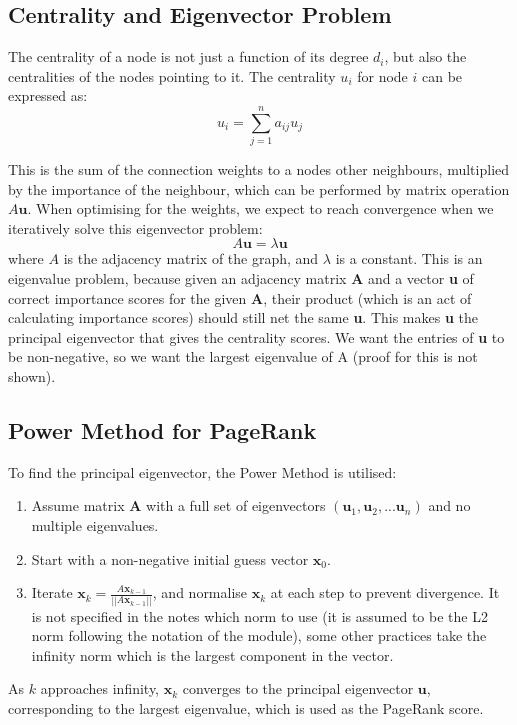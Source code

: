 \subsection*{Centrality and Eigenvector Problem}
The centrality of a node is not just a function of its degree \( d_i \), but also the centralities of the nodes pointing to it. The centrality \( u_i \) for node \( i \) can be expressed as:
\[ u_i = \sum_{j=1}^{n} a_{ij}u_j \]

This is the sum of the connection weights to a nodes other neighbours, multiplied by the importance of the neighbour, which can be performed by matrix operation $A\textbf{u}$. When optimising for the weights, we expect to reach convergence when we iteratively solve this eigenvector problem:
\[ A\mathbf{u} = \lambda \mathbf{u} \]
where \( A \) is the adjacency matrix of the graph, and \( \lambda \) is a constant. This is an eigenvalue problem, because given an adjacency matrix \textbf{A} and a vector \textbf{u} of correct importance scores for the given \textbf{A}, their product (which is an act of calculating importance scores) should still net the same \textbf{u}. This makes \textbf{u} the principal eigenvector that gives the centrality scores. We want the entries of \textbf{u} to be non-negative, so we want the largest eigenvalue of A (proof for this is not shown).

\subsection*{Power Method for PageRank}
To find the principal eigenvector, the Power Method is utilised:
\begin{enumerate}
     \item Assume matrix $\textbf{A}$ with a full set of eigenvectors $(\textbf{u}_1, \textbf{u}_2, ... \textbf{u}_n)$ and no multiple eigenvalues.
     \item Start with a non-negative initial guess vector \( \mathbf{x}_0 \).
    \item Iterate \( \mathbf{x}_{k} = \frac{A\mathbf{x}_{k-1} }{||A\mathbf{x}_{k-1} ||}\), and normalise \( \mathbf{x}_{k} \) at each step to prevent divergence. It is not specified in the notes which norm to use (it is assumed to be the L2 norm following the notation of the module), some other practices take the infinity norm which is the largest component in the vector.
\end{enumerate}
As \( k \) approaches infinity, \( \mathbf{x}_{k} \) converges to the principal eigenvector \( \mathbf{u} \), corresponding to the largest eigenvalue, which is used as the PageRank score.\\

